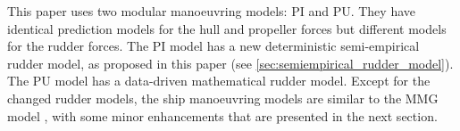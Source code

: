 This paper uses two modular manoeuvring models: PI and PU. They have identical prediction models for the hull and propeller forces but different models for the rudder forces. The PI model has a new deterministic semi-empirical rudder model, as proposed in this paper (see \autoref{sec:semiempirical_rudder_model}). The PU model has a data-driven mathematical rudder model. 
Except for the changed rudder models, the ship manoeuvring models are similar to the MMG model \citep{yasukawa_introduction_2015}, with some minor enhancements that are presented in the next section.